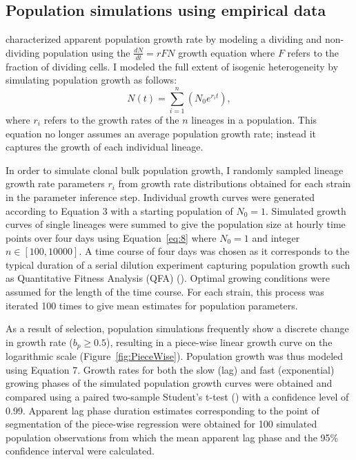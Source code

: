 \documentclass{bioinfo}
\begin{document}
\vspace{-1em}
\subsection{Population simulations using empirical data}

\cite{Pirt75} characterized apparent population growth rate by modeling a dividing and non-dividing population using the $\frac{dN}{dt}=rFN$ growth equation where $F$ refers to the fraction of dividing cells. I modeled the full extent of isogenic heterogeneity by simulating population growth as follows:
\begin{equation}
N(t)=\sum_{i=1}^{n}(N_0e^{r_it}),
\label{eq:8}
\end{equation}
where $r_i$ refers to the growth rates of the $n$ lineages in a population. This equation no longer assumes an average population growth rate; instead it captures the growth of each individual lineage. 

In order to simulate clonal bulk population growth, I randomly sampled lineage growth rate parameters $r_i$ from growth rate distributions obtained for each strain in the parameter inference step. Individual growth curves were generated according to Equation 3 with a starting population of $N_0=1$. Simulated growth curves of single lineages were summed to give the population size at hourly time points over four days using Equation~\ref{eq:8} where $N_0=1$ and integer $n\in [100,10000]$. A time course of four days was chosen as it corresponds to the typical duration of a serial dilution experiment capturing population growth such as Quantitative Fitness Analysis (QFA) (\citealp{Addinall11}). Optimal growing conditions were assumed for the length of the time course. For each strain, this process was iterated 100 times to give mean estimates for population parameters. 

As a result of selection, population simulations frequently show a discrete change in growth rate ($b_p\geq 0.5$), resulting in a piece-wise linear growth curve on the logarithmic scale (Figure~\ref{fig:PieceWise}). Population growth was thus modeled using Equation 7. Growth rates for both the slow (lag) and fast (exponential) growing phases of the simulated population growth curves were obtained and compared using a paired two-sample Student's t-test (\citealp{Welch47}) with a confidence level of 0.99. Apparent lag phase duration estimates corresponding to the point of segmentation of the piece-wise regression were obtained for 100 simulated population observations from which the mean apparent lag phase and the 95\% confidence interval were calculated.
\end{document}
